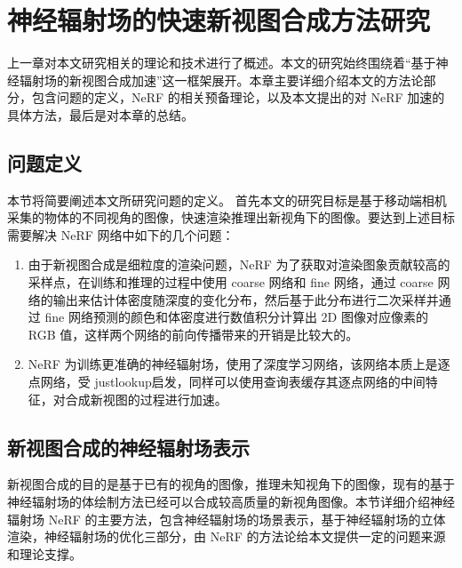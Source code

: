 
\chapter{神经辐射场的快速新视图合成方法研究}\label{citations}
上一章对本文研究相关的理论和技术进行了概述。本文的研究始终围绕着“基于神经辐射场的新视图合成加速”这一框架展开。本章主要详细介绍本文的方法论部分，包含问题的定义，NeRF 的相关预备理论，以及本文提出的对 NeRF 加速的具体方法，最后是对本章的总结。

\section{问题定义}
本节将简要阐述本文所研究问题的定义。
首先本文的研究目标是基于移动端相机采集的物体的不同视角的图像，快速渲染推理出新视角下的图像。要达到上述目标需要解决 NeRF 网络中如下的几个问题：
\begin{enumerate}
    \item 由于新视图合成是细粒度的渲染问题，NeRF 为了获取对渲染图象贡献较高的采样点，在训练和推理的过程中使用 coarse 网络和 fine 网络，通过 coarse 网络的输出来估计体密度随深度的变化分布，然后基于此分布进行二次采样并通过 fine 网络预测的颜色和体密度进行数值积分计算出 2D 图像对应像素的 RGB 值，这样两个网络的前向传播带来的开销是比较大的。
    \item NeRF 为训练更准确的神经辐射场，使用了深度学习网络，该网络本质上是逐点网络，受 justlookup\cite{lin2019justlookup}启发，同样可以使用查询表缓存其逐点网络的中间特征，对合成新视图的过程进行加速。
\end{enumerate}

\section{新视图合成的神经辐射场表示}
新视图合成的目的是基于已有的视角的图像，推理未知视角下的图像，现有的基于神经辐射场的体绘制方法已经可以合成较高质量的新视角图像。本节详细介绍神经辐射场 NeRF 的主要方法，包含神经辐射场的场景表示，基于神经辐射场的立体渲染，神经辐射场的优化三部分，由 NeRF 的方法论给本文提供一定的问题来源和理论支撑。


